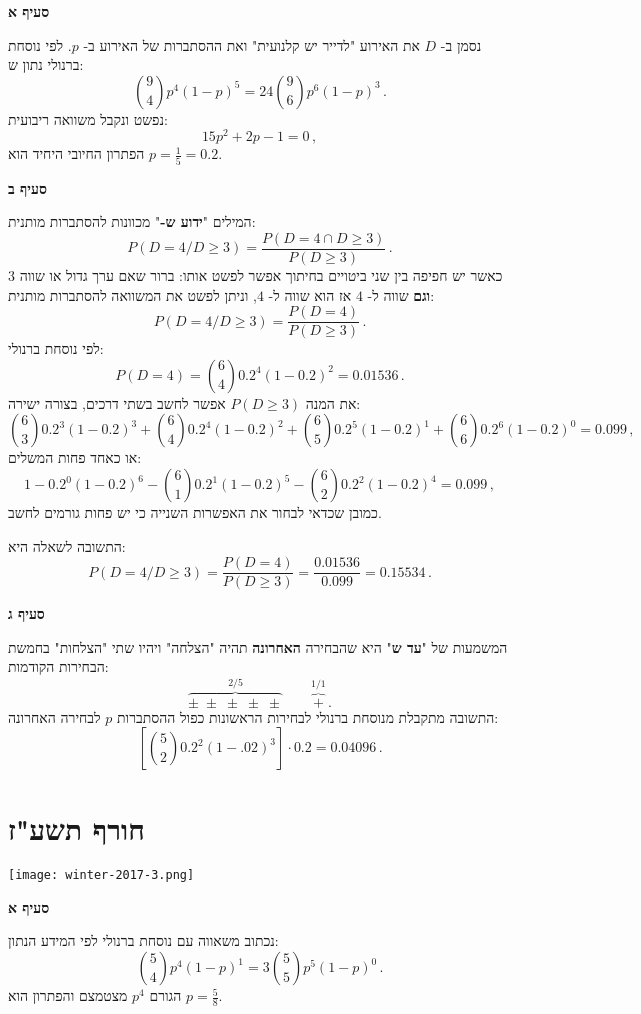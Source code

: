 \textbf{סעיף א}

נסמן ב-%
$D$
את האירוע "לדייר יש קלנועית" ואת ההסתברות של האירוע ב-%
$p$.
לפי נוסחת ברנולי נתון ש:
\[
{9\choose 4} p^4 (1-p)^5=24 {9\choose 6} p^6 (1-p)^3\,.
\]
נפשט ונקבל משוואה ריבועית:
\[
15p^2+2p-1=0\,,
\]
הפתרון החיובי היחיד הוא 
$p=\displaystyle\frac{1}{5}=0.2$.

\textbf{סעיף ב}

המילים
"\textbf{ידוע ש-}"
מכוונות להסתברות מותנית:
\[
P(D=4/D\ge3) = \frac{P(D=4\cap D\ge 3)}{P(D\ge 3)}\,.
\]
כאשר יש חפיפה בין שני ביטויים בחיתוך אפשר לפשט אותו: ברור שאם ערך גדול או שווה
$3$
\textbf{וגם}
שווה ל-%
$4$
אז הוא שווה ל-%
$4$,
וניתן לפשט את המשוואה להסתברות מותנית:
\[
P(D=4/D\ge3) =\frac{P(D=4)}{P(D\ge 3)}\,.
\]
לפי נוסחת ברנולי:
\[
P(D=4)={6\choose 4} 0.2^4 (1-0.2)^2= 0.01536\,.
\]
את המנה
$P(D\ge 3)$
אפשר לחשב בשתי דרכים, בצורה ישירה: 
\[
{6\choose 3}0.2^3(1-0.2)^3+{6\choose 4}0.2^4(1-0.2)^2 + {6 \choose 5} 0.2^5(1-0.2)^1+ {6 \choose 6} 0.2^6(1-0.2)^0=0.099\,,
\]
\np
 או כאחד פחות המשלים:
\[
1-0.2^0(1-0.2)^6-{6\choose 1}0.2^1(1-0.2)^5 - {6 \choose 2} 0.2^2(1-0.2)^4=0.099\,,
\]
כמובן שכדאי לבחור את האפשרות השנייה כי יש פחות גורמים לחשב.

התשובה לשאלה היא:
\[
P(D=4/D\ge3) =\displaystyle\frac{P(D=4)}{P(D\ge 3)}=\displaystyle\frac{0.01536}{0.099}=0.15534\,.
\]


\textbf{סעיף ג}

המשמעות של
"\textbf{עד ש}"
היא שהבחירה 
\textbf{האחרונה} 
תהיה "הצלחה" ויהיו שתי "הצלחות" בחמשת הבחירות הקודמות:
\[
\overbrace{\pm\;\pm\;\pm\;\pm\;\pm}^{2/5}\quad\quad \overbrace{+}^{1/1}\,.
\]
התשובה מתקבלת מנוסחת ברנולי לבחירות הראשונות כפול ההסתברות
$p$
לבחירה האחרונה:
\[
\left[{5\choose 2}0.2^2 (1-.02)^3\right]\cdot 0.2=0.04096\,.
\]

\np
\section{חורף תשע"ז}

\begin{center}
\texttt{[image: winter-2017-3.png]}
\end{center}
\vspace{-1ex}

\textbf{סעיף א}

נכתוב משאווה עם נוסחת ברנולי לפי המידע הנתון:
\[
{5 \choose 4} p^4(1-p)^1 = 3{5\choose 5}p^5(1-p)^0\,.
\]
הגורם
$p^4$
מצטמצם והפתרון הוא
$p=\displaystyle\frac{5}{8}$.

